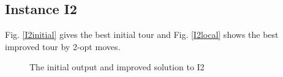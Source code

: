 \documentclass[11pt]{article}
\begin{document}
\subsection{Instance I2}
Fig. \ref{I2initial} gives the best initial tour and Fig. \ref{I2local} shows the best improved tour by 2-opt moves.
\begin{figure}[ht]
\centering
{}
\caption{The initial output and improved solution to I2}
\label{I2} %
\end{figure}
\end{document}
